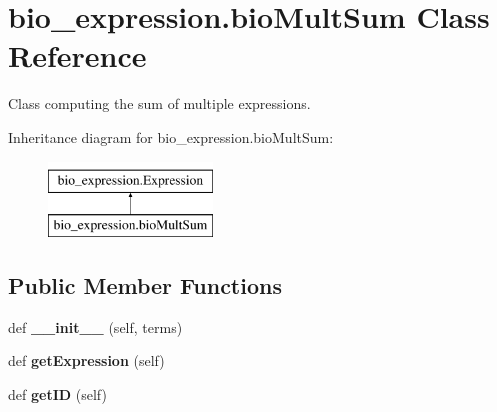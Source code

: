\hypertarget{classbio__expression_1_1bio_mult_sum}{}\section{bio\+\_\+expression.\+bio\+Mult\+Sum Class Reference}
\label{classbio__expression_1_1bio_mult_sum}


Class computing the sum of multiple expressions.  


Inheritance diagram for bio\+\_\+expression.\+bio\+Mult\+Sum\+:\begin{figure}[H]
\begin{center}
\leavevmode
\includegraphics[height=2.000000cm]{classbio__expression_1_1bio_mult_sum}
\end{center}
\end{figure}
\subsection*{Public Member Functions}
\begin{DoxyCompactItemize}
\item 
def {\bfseries \+\_\+\+\_\+init\+\_\+\+\_\+} (self, terms)\hypertarget{classbio__expression_1_1bio_mult_sum_ac5635a57e72fa9268e3a5a1b6328ff7e}{}\label{classbio__expression_1_1bio_mult_sum_ac5635a57e72fa9268e3a5a1b6328ff7e}

\item 
def {\bfseries get\+Expression} (self)\hypertarget{classbio__expression_1_1bio_mult_sum_a9e21814cd133b68fec6b85ed72ca37a8}{}\label{classbio__expression_1_1bio_mult_sum_a9e21814cd133b68fec6b85ed72ca37a8}

\item 
def {\bfseries get\+ID} (self)\hypertarget{classbio__expression_1_1bio_mult_sum_a9a2061990d57ad4468b8d78c4e791a7a}{}\label{classbio__expression_1_1bio_mult_sum_a9a2061990d57ad4468b8d78c4e791a7a}

\end{DoxyCompactItemize}
